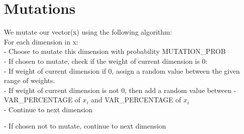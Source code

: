 \documentclass[10pt]{report}
\theoremstyle{definition}
\theoremstyle{plain}
\begin{document}
\section*{Mutations}
We mutate our vector(x) using the following algorithm: \\
For each dimension in x: \\
- Choose to mutate this dimension with probability MUTATION\_PROB \\ \hspace*{0.4cm}
    - If chosen to mutate, check if the weight of current dimension is 0: \\ \hspace*{0.8cm}
        - If weight of current dimension if 0, assign a random value between the given range of weights. \\ \hspace*{0.8cm}
        - If weight of current dimension is not 0, then add a random value between -VAR\_PERCENTAGE of $x_i$ and VAR\_PERCENTAGE of $x_i$ \\ \hspace*{0.8cm}
        - Continue to next dimension \\ \hspace*{0.4cm}
    
    - If chosen not to mutate, continue to next dimension \\
\end{document}
